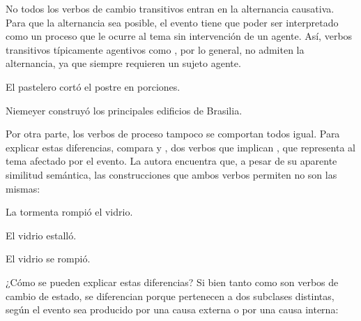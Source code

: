 \begin{recuadro}
No todos los verbos de cambio transitivos entran en la alternancia causativa.
Para que la alternancia sea posible, el evento tiene que poder ser interpretado
como un proceso que le ocurre al tema sin intervención de un agente. Así, verbos
transitivos típicamente agentivos como , por lo general, no admiten la alternancia, ya que siempre requieren un
sujeto agente.

\begin{exe}
  \ex
    \begin{xlist}
      \ex El pastelero cortó el postre en porciones.
    \end{xlist}
  \ex
    \begin{xlist}
      \ex Niemeyer construyó los principales edificios de Brasilia.
    \end{xlist}
\end{exe}

Por otra parte, los verbos de proceso tampoco se comportan todos igual. Para
explicar estas diferencias, \textcite{mendikoetxea2011} compara  y
, dos verbos que implican , que representa al tema afectado por el evento. La autora encuentra que,
a pesar de su aparente similitud semántica, las construcciones que ambos verbos
permiten no son las mismas:

\begin{exe}
  \ex
    \begin{xlist}
      \ex La tormenta rompió el vidrio.
    \end{xlist}
  \ex
    \begin{xlist}
      \ex El vidrio estalló.
    \end{xlist}
  \ex
    \begin{xlist}
      \ex El vidrio se rompió.
    \end{xlist}
\end{exe}

¿Cómo se pueden explicar estas diferencias? Si bien tanto  como
 son verbos de cambio de estado, se diferencian porque pertenecen
a dos subclases distintas, según el evento sea producido por una causa externa o
por una causa interna:


\end{recuadro}
